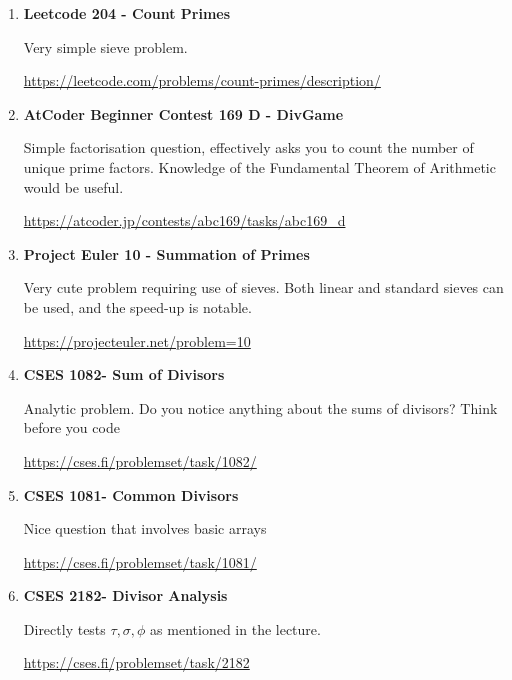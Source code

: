 \documentclass[11pt]{article}
\begin{document}
\begin{enumerate}
    \item \textbf{Leetcode 204 - Count Primes}
    
    Very simple sieve problem. 
    
    \vspace{0.3em}
    {\url{https://leetcode.com/problems/count-primes/description/}}

    \vspace{0.8em}

    \item \textbf{AtCoder Beginner Contest 169 D - DivGame}
    
    Simple factorisation question, effectively asks you to count the number of unique prime factors. Knowledge of the Fundamental Theorem of Arithmetic would be useful.
    
    \vspace{0.3em}
    {\url{https://atcoder.jp/contests/abc169/tasks/abc169_d}}

    \vspace{0.8em}

    \item \textbf{Project Euler 10 - Summation of Primes}
    
    Very cute problem requiring use of sieves. Both linear and standard sieves can be used, and the speed-up is notable.

    \vspace{0.3em}
    {\url{https://projecteuler.net/problem=10}}

    \vspace{0.8em}

    \item \textbf{CSES 1082- Sum of Divisors }
    
    Analytic problem. Do you notice anything about the sums of divisors? Think before you code

    \vspace{0.3em}
    {\url{https://cses.fi/problemset/task/1082/}}

    \vspace{0.8em}

    \item \textbf{CSES 1081- Common Divisors }
    
    Nice question that involves basic arrays

    \vspace{0.3em}
    {\url{https://cses.fi/problemset/task/1081/}}

    \vspace{0.8em}

    \item \textbf{CSES 2182- Divisor Analysis }
    
    Directly tests $\tau, \sigma,  \phi $ as mentioned in the lecture.

    \vspace{0.3em}
    {\url{https://cses.fi/problemset/task/2182}}

    \vspace{0.8em}

\end{enumerate}
\end{document}
